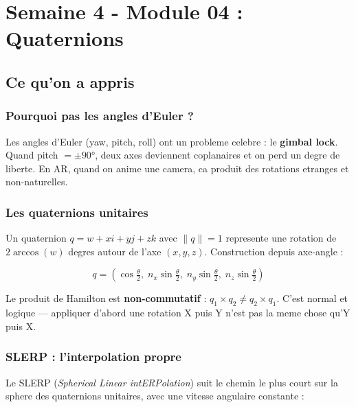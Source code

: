 \documentclass[12pt,a4paper]{report}
\begin{document}
\chapter{Semaine 4 - Module 04 : Quaternions}

\section{Ce qu'on a appris}

\subsection*{Pourquoi pas les angles d'Euler ?}

Les angles d'Euler (yaw, pitch, roll) ont un probleme celebre : le \textbf{gimbal lock}. Quand pitch $= \pm90°$, deux axes deviennent coplanaires et on perd un degre de liberte. En AR, quand on anime une camera, ca produit des rotations etranges et non-naturelles.

\subsection*{Les quaternions unitaires}

Un quaternion $q = w + xi + yj + zk$ avec $\|q\|=1$ represente une rotation de $2\arccos(w)$ degres autour de l'axe $(x,y,z)$. Construction depuis axe-angle :

\[
q = \left(\cos\tfrac{\theta}{2},\;
    n_x\sin\tfrac{\theta}{2},\;
    n_y\sin\tfrac{\theta}{2},\;
    n_z\sin\tfrac{\theta}{2}\right)
\]

\begin{conceptbox}
Le produit de Hamilton est \textbf{non-commutatif} : $q_1 \times q_2 \neq q_2 \times q_1$. C'est normal et logique --- appliquer d'abord une rotation X puis Y n'est pas la meme chose qu'Y puis X.
\end{conceptbox}

\subsection*{SLERP : l'interpolation propre}

Le SLERP (\textit{Spherical Linear intERPolation}) suit le chemin le plus court sur la sphere des quaternions unitaires, avec une vitesse angulaire constante :
\end{document}

